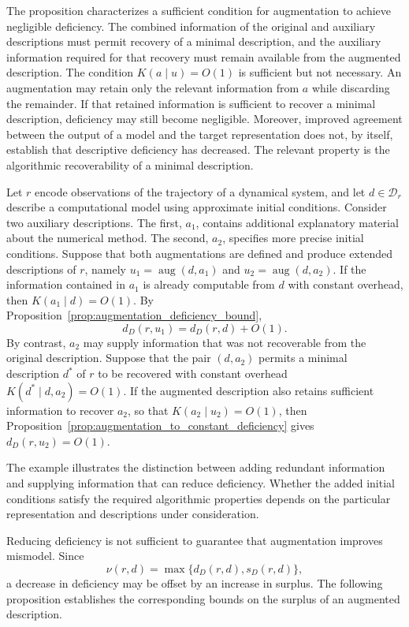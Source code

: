 The proposition characterizes a sufficient condition for augmentation to achieve negligible deficiency. The combined information of the original and auxiliary descriptions must permit recovery of a minimal description, and the auxiliary information required for that recovery must remain available from the augmented description. The condition $K(a\mid u)=O(1)$ is sufficient but not necessary. An augmentation may retain only the relevant
information from $a$ while discarding the remainder. If that retained information is sufficient to recover a minimal description, deficiency may still become negligible. Moreover, improved agreement between the output of a model and the target representation does not, by itself, establish that descriptive deficiency has decreased. The relevant property is the algorithmic recoverability of a minimal description.

\begin{example}
Let $r$ encode observations of the trajectory of a dynamical system, and let $d\in\mathcal D_r$ describe a computational model using approximate initial conditions. Consider two auxiliary descriptions. The first, $a_1$, contains additional explanatory material about the numerical method. The second, $a_2$, specifies more
precise initial conditions. Suppose that both augmentations are defined and produce extended descriptions of $r$, namely $u_1=\operatorname{aug}(d,a_1)$ and $u_2=\operatorname{aug}(d,a_2)$. If the information contained in $a_1$ is already computable from $d$ with constant overhead, then $K(a_1\mid d)=O(1)$. By Proposition~\ref{prop:augmentation_deficiency_bound},
\[
d_D(r,u_1)=d_D(r,d)+O(1).
\]
By contrast, $a_2$ may supply information that was not recoverable from the original description. Suppose that the pair $(d,a_2)$ permits a minimal description $d^\ast$ of $r$ to be recovered with constant overhead $K(d^\ast\mid d,a_2)=O(1)$. If the augmented description also retains sufficient information to recover $a_2$, so that $K(a_2\mid u_2)=O(1)$, then Proposition~\ref{prop:augmentation_to_constant_deficiency} gives $d_D(r,u_2)=O(1)$.
\end{example}

The example illustrates the distinction between adding redundant information and supplying information that can reduce deficiency. Whether the added initial conditions satisfy the required algorithmic properties depends on the particular representation and descriptions under consideration.

Reducing deficiency is not sufficient to guarantee that augmentation improves mismodel. Since
\[
\nu(r,d)=\max\{d_D(r,d),s_D(r,d)\},
\]
a decrease in deficiency may be offset by an increase in surplus. The following proposition establishes the corresponding bounds on the surplus of an augmented description.

